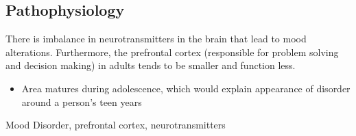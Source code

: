 \documentclass[journal]{IEEEtran}
\begin{document}
\subsection{Pathophysiology}
There is imbalance in neurotransmitters in the brain that lead to mood alterations. Furthermore, the prefrontal cortex (responsible for problem solving and decision making) in adults tends to be smaller and function less.
\begin{itemize}
\item Area matures during adolescence, which would explain appearance of disorder around a person's teen years
\end{itemize}
\begin{IEEEkeywords}
Mood Disorder, prefrontal cortex, neurotransmitters
\end{IEEEkeywords}
\end{document}
